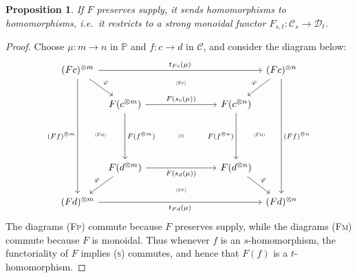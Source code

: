 \documentclass[11pt, oneside, article]{memoir}
\theoremstyle{plain}
\newtheorem{proposition}[theorem]{Proposition}
\theoremstyle{definition}
\theoremstyle{remark}
\newcommand{\cat}[1]{\mathcal{#1}}%
\newcommand{\tpow}[1]{^{\otimes #1}}
\newcommand{\pp}{\mathbb{P}}
\begin{document}
\begin{proposition}\label{prop.preserve_homs}
If $F$ preserves supply, it sends homomorphisms to homomorphisms, i.e.\ it restricts to a strong monoidal functor $F_{s,t}\colon\cat{C}_s\to\cat{D}_t$.
\end{proposition}
\begin{proof}
Choose $\mu\colon m\to n$ in $\pp$ and $f\colon c\to d$ in $\cat{C}$, and consider the diagram below:
\[
\begin{tikzcd}[column sep=6pt]
	(Fc)\tpow{m}
		\ar[rrrr, "t_{Fc}(\mu)"]
		\ar[dddd, "(Ff)\tpow{m}"']
		\ar[dr, "\varphi"]
		&
    &[23pt] 
    \ar[d, phantom, near start,  "\textsc{\tiny (Fp)}"]
		&[23pt]
    &
  (Fc)\tpow{n}
		\ar[dddd, "(Ff)\tpow{n}"]
		\ar[dl, "\varphi"']
		\\
		&
	F(c\tpow{m})
		\ar[dd, "F(f\tpow{m})"]
    \ar[rr, "F(s_{c}(\mu))"]
    &
    ~
    &
	F(c\tpow{n})
    \ar[dd, "F(f\tpow{n})"']
    \\
    \ar[r, phantom,"\textsc{\tiny (Fm)}"]
    &~& 
    \textsc{\tiny (s)}
    &~&
    \ar[l, phantom,"\textsc{\tiny (Fm)}"]
		\\
		&
	F(d\tpow{m})
		\ar[rr, "F(s_d(\mu))"']
    \ar[dl, "\varphi"']
    &
    \ar[d, phantom, pos=.6, "\textsc{\tiny (Fp)}"]
    &
	F(d\tpow{n})
    \ar[dr, "\varphi"]
    \\
	(Fd)\tpow{m}
		\ar[rrrr, "t_{Fd}(\mu)"']
		&&~&&
	(Fd)\tpow{n}
\end{tikzcd}
\]
The diagrams \textsc{(Fp)} commute because $F$ preserves supply, while the diagrams \textsc{(Fm)} commute because $F$ is monoidal. Thus whenever $f$ is an $s$-homomorphism, the functoriality of $F$ implies \textsc{(s)} commutes, and hence that $F(f)$ is a $t$-homomorphism.
\end{proof}
\end{document}
